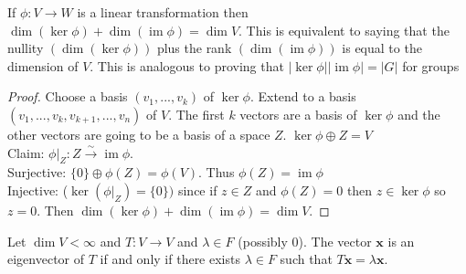 \documentclass{article}
\newcommand{\ra}[1][]{\xrightarrow{#1}}
\DeclareMathOperator{\im}{im}
\begin{document}
\begin{theorem}
If $\phi:V\ra W$ is a linear transformation then $\dim(\ker\phi)+\dim(\im\phi)=\dim V$. This is equivalent to saying that the nullity $(\dim(\ker\phi))$ plus the rank $(\dim(\im\phi))$ is equal to the dimension of $V$. This is analogous to proving that $|\ker\phi||\im\phi|=|G|$ for groups 
\end{theorem}
\begin{proof}
Choose a basis $(v_1,...,v_k)$ of $\ker\phi$. Extend to a basis $(v_1,...,v_k,v_{k+1},...,v_n)$ of $V$. The first $k$ vectors are a basis of $\ker\phi$ and the other vectors are going to be a basis of a space $Z$. $\ker\phi\oplus Z=V$\\
Claim: $\phi|_Z:Z\ra[\sim] \im\phi$. \\
Surjective: $\{0\}\oplus\phi(Z)=\phi(V)$. Thus $\phi(Z)=\im\phi$\\
Injective: ($\ker(\phi|_Z)=\{0\})$ since if $z\in Z$ and $\phi(Z)=0$ then $z\in \ker\phi$ so $z=0$. Then $\dim(\ker\phi)+\dim(\im\phi)=\dim V$. 
\end{proof}
\begin{definition}[Eigenvector]
Let $\dim V<\infty$ and $T:V\ra V$ and $\lambda\in F$ (possibly 0). The vector $\mathbf{x}$ is an eigenvector of $T$ if and only if there exists $\lambda\in F$ such that $T\mathbf{x}=\lambda\mathbf{x}$. 
\end{definition}
\end{document}
